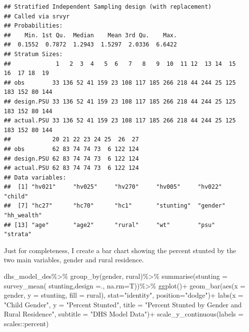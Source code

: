 \documentclass[
]{article}
\newenvironment{Shaded}{\begin{snugshade}}{\end{snugshade}}
\newcommand{\AttributeTok}[1]{\textcolor[rgb]{0.77,0.63,0.00}{#1}}
\newcommand{\FunctionTok}[1]{\textcolor[rgb]{0.00,0.00,0.00}{#1}}
\newcommand{\NormalTok}[1]{#1}
\newcommand{\SpecialCharTok}[1]{\textcolor[rgb]{0.00,0.00,0.00}{#1}}
\newcommand{\StringTok}[1]{\textcolor[rgb]{0.31,0.60,0.02}{#1}}
\begin{document}
\begin{verbatim}
## Stratified Independent Sampling design (with replacement)
## Called via srvyr
## Probabilities:
##    Min. 1st Qu.  Median    Mean 3rd Qu.    Max. 
##  0.1552  0.7872  1.2943  1.5297  2.0336  6.6422 
## Stratum Sizes: 
##             1   2  3  4   5  6   7   8   9  10  11 12  13 14  15  16  17 18  19
## obs        33 136 52 41 159 23 108 117 185 266 218 44 244 25 125 183 152 80 144
## design.PSU 33 136 52 41 159 23 108 117 185 266 218 44 244 25 125 183 152 80 144
## actual.PSU 33 136 52 41 159 23 108 117 185 266 218 44 244 25 125 183 152 80 144
##            20 21 22 23 24 25  26  27
## obs        62 83 74 74 73  6 122 124
## design.PSU 62 83 74 74 73  6 122 124
## actual.PSU 62 83 74 74 73  6 122 124
## Data variables:
##  [1] "hv021"     "hv025"     "hv270"     "hv005"     "hv022"     "child"    
##  [7] "hc27"      "hc70"      "hc1"       "stunting"  "gender"    "hh_wealth"
## [13] "age"       "age2"      "rural"     "wt"        "psu"       "strata"
\end{verbatim}

Just for completeness, I create a bar chart showing the percent stunted by the two main variables, gender and rural residence.

\begin{Shaded}
\begin{Highlighting}[]
\NormalTok{dhs\_model\_des}\SpecialCharTok{\%\textgreater{}\%}
  \FunctionTok{group\_by}\NormalTok{(gender, rural)}\SpecialCharTok{\%\textgreater{}\%}
  \FunctionTok{summarise}\NormalTok{(}\AttributeTok{stunting =} \FunctionTok{survey\_mean}\NormalTok{( stunting,}\AttributeTok{design =}\NormalTok{.,}
                              \AttributeTok{na.rm=}\NormalTok{T))}\SpecialCharTok{\%\textgreater{}\%}
  \FunctionTok{ggplot}\NormalTok{()}\SpecialCharTok{+}
  \FunctionTok{geom\_bar}\NormalTok{(}\FunctionTok{aes}\NormalTok{(}\AttributeTok{x =}\NormalTok{ gender, }\AttributeTok{y  =}\NormalTok{ stunting, }\AttributeTok{fill =}\NormalTok{ rural),}
           \AttributeTok{stat=}\StringTok{"identity"}\NormalTok{,}
           \AttributeTok{position=}\StringTok{"dodge"}\NormalTok{)}\SpecialCharTok{+}
  \FunctionTok{labs}\NormalTok{(}\AttributeTok{x =} \StringTok{"Child Gender"}\NormalTok{, }
       \AttributeTok{y =} \StringTok{"Percent Stunted"}\NormalTok{, }
       \AttributeTok{title =} \StringTok{"Percent Stunted by Gender and Rural Residence"}\NormalTok{,}
       \AttributeTok{subtitle =} \StringTok{"DHS Model Data"}\NormalTok{)}\SpecialCharTok{+}
  \FunctionTok{scale\_y\_continuous}\NormalTok{(}\AttributeTok{labels =}\NormalTok{ scales}\SpecialCharTok{::}\NormalTok{percent)}
\end{Highlighting}
\end{Shaded}
\end{document}
